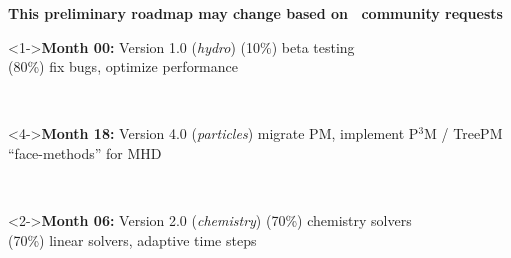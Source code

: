 \NEWSEC

\subsection{\ssRoadmap}

\begin{frame}[fragile,label=ss-roadmap] 
\secframetitle{\ssRoadmap}
\scriptsize
\newcommand{\alignbox}[2]{}
\blockblue
\textbf{\ \\ This preliminary roadmap may change based on \enzo\ community requests}
\begin{center}
\begin{minipage}{4.5in}
\begin{minipage}{2.0in}
\begin{block}<1->{\textbf{Month 00:} Version 1.0 (\textit{hydro})}
\scriptsize
\textcolor{enzop}{(10\%) beta testing} \\
\textcolor{cello}{(80\%) fix bugs, optimize performance}
\end{block}
\end{minipage} \ 
\begin{minipage}{2.0in}
\begin{block}<4->{\textbf{Month 18:} Version 4.0 (\textit{particles})}
\scriptsize
\textcolor{enzop}{ migrate PM, implement P$^3$M / TreePM} \\
\textcolor{cello}{ ``face-methods'' for MHD}
\end{block}
\end{minipage}
\end{minipage} \\
\begin{minipage}{4.5in}
\begin{minipage}{2.0in}
\begin{block}<2->{\textbf{Month 06:} Version 2.0 (\textit{chemistry})}
\scriptsize
\textcolor{enzop}{(70\%) chemistry solvers} \\
\textcolor{cello}{(70\%) linear solvers, adaptive time steps}
\end{block}
\end{minipage} \ 

\end{minipage}
\end{center}
\end{frame}
